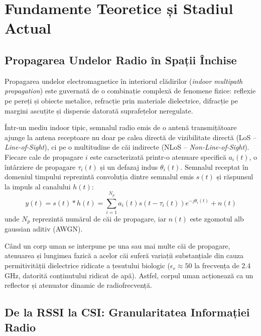 \chapter{Fundamente Teoretice și Stadiul Actual}
\label{chap:fundamente_teoretice}

\section{Propagarea Undelor Radio în Spații Închise}
Propagarea undelor electromagnetice în interiorul clădirilor (\textit{indoor multipath propagation}) este guvernată de o combinație complexă de fenomene fizice: reflexie pe pereți și obiecte metalice, refracție prin materiale dielectrice, difracție pe margini ascuțite și dispersie datorată suprafețelor neregulate.

Într-un mediu indoor tipic, semnalul radio emis de o antenă transmițătoare ajunge la antena receptoare nu doar pe calea directă de vizibilitate directă (LoS -- \textit{Line-of-Sight}), ci pe o multitudine de căi indirecte (NLoS -- \textit{Non-Line-of-Sight}). Fiecare cale de propagare $i$ este caracterizată printr-o atenuare specifică $a_i(t)$, o întârziere de propagare $\tau_i(t)$ și un defazaj indus $\theta_i(t)$. Semnalul receptat în domeniul timpului reprezintă convoluția dintre semnalul emis $s(t)$ și răspunsul la impuls al canalului $h(t)$:
\begin{equation}
    y(t) = s(t) * h(t) = \sum_{i=1}^{N_p} a_i(t) s(t - \tau_i(t)) e^{-j \theta_i(t)} + n(t)
    \label{eq:channel_impulse_response}
\end{equation}
unde $N_p$ reprezintă numărul de căi de propagare, iar $n(t)$ este zgomotul alb gaussian aditiv (AWGN).

Când un corp uman se interpune pe una sau mai multe căi de propagare, atenuarea și lungimea fazică a acelor căi suferă variații substanțiale din cauza permitivității dielectrice ridicate a țesutului biologic ($\epsilon_r \approx 50$ la frecvența de 2.4 GHz, datorită conținutului ridicat de apă). Astfel, corpul uman acționează ca un reflector și atenuator dinamic de radiofrecvență.

\section{De la RSSI la CSI: Granularitatea Informației Radio}
